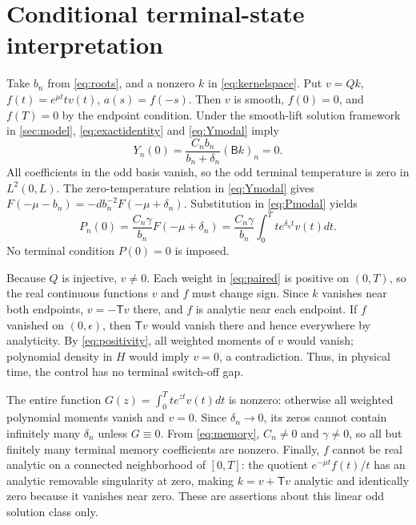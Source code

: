 \section{Conditional terminal-state interpretation}\label{sec:interpretation}
Take \(b_n\) from \eqref{eq:roots}, and a nonzero \(k\) in \eqref{eq:kernelspace}. Put \(v=Qk\), \(f(t)=e^{\mu t}tv(t)\), \(a(s)=f(-s)\). Then \(v\) is smooth, \(f(0)=0\), and \(f(T)=0\) by the endpoint condition. Under the smooth-lift solution framework in \cref{sec:model}, \eqref{eq:exactidentity} and \eqref{eq:Ymodal} imply
\begin{equation}\label{eq:temperature}
Y_n(0)=\frac{C_nb_n}{b_n+\delta_n}(\mathsf Bk)_n=0.
\end{equation}
All coefficients in the odd basis vanish, so the odd terminal temperature is zero in \(L^2(0,L)\). The zero-temperature relation in \eqref{eq:Ymodal} gives \(F(-\mu-b_n)=-d b_n^{-2}F(-\mu+\delta_n)\). Substitution in \eqref{eq:Pmodal} yields
\begin{equation}\label{eq:memory}
P_n(0)=\frac{C_n\gamma}{b_n}F(-\mu+\delta_n)
=\frac{C_n\gamma}{b_n}\int_0^T te^{\delta_nt}v(t)dt.
\end{equation}
No terminal condition \(P(0)=0\) is imposed.

Because \(Q\) is injective, \(v\ne0\). Each weight in \eqref{eq:paired} is positive on \((0,T)\), so the real continuous functions \(v\) and \(f\) must change sign. Since \(k\) vanishes near both endpoints, \(v=-\mathsf Tv\) there, and \(f\) is analytic near each endpoint. If \(f\) vanished on \((0,\epsilon)\), then \(\mathsf Tv\) would vanish there and hence everywhere by analyticity. By \eqref{eq:positivity}, all weighted moments of \(v\) would vanish; polynomial density in \(H\) would imply \(v=0\), a contradiction. Thus, in physical time, the control has no terminal switch-off gap.

The entire function \(G(z)=\int_0^T te^{zt}v(t)dt\) is nonzero: otherwise all weighted polynomial moments vanish and \(v=0\). Since \(\delta_n\to0\), its zeros cannot contain infinitely many \(\delta_n\) unless \(G\equiv0\). From \eqref{eq:memory}, \(C_n\ne0\) and \(\gamma\ne0\), so all but finitely many terminal memory coefficients are nonzero. Finally, \(f\) cannot be real analytic on a connected neighborhood of \([0,T]\): the quotient \(e^{-\mu t}f(t)/t\) has an analytic removable singularity at zero, making \(k=v+\mathsf Tv\) analytic and identically zero because it vanishes near zero. These are assertions about this linear odd solution class only.
